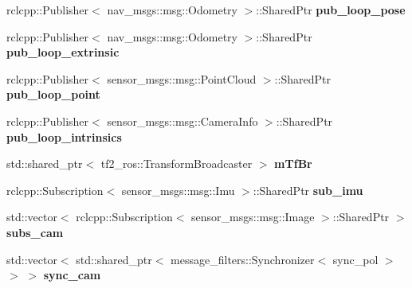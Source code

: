 \begin{DoxyCompactItemize}
\item 
\mbox{\label{classov__msckf_1_1ROS2Visualizer_a00966d928bfb510bf40aa6b6f59cb679}} 
rclcpp\+::\+Publisher$<$ nav\+\_\+msgs\+::msg\+::\+Odometry $>$\+::Shared\+Ptr {\bfseries pub\+\_\+loop\+\_\+pose}
\item 
\mbox{\label{classov__msckf_1_1ROS2Visualizer_aa7886e9a043be1355cc17e12109dd80d}} 
rclcpp\+::\+Publisher$<$ nav\+\_\+msgs\+::msg\+::\+Odometry $>$\+::Shared\+Ptr {\bfseries pub\+\_\+loop\+\_\+extrinsic}
\item 
\mbox{\label{classov__msckf_1_1ROS2Visualizer_ac20c79b7fd228d470a9b46d117f05b94}} 
rclcpp\+::\+Publisher$<$ sensor\+\_\+msgs\+::msg\+::\+Point\+Cloud $>$\+::Shared\+Ptr {\bfseries pub\+\_\+loop\+\_\+point}
\item 
\mbox{\label{classov__msckf_1_1ROS2Visualizer_a5f7d5dd515043eda74a01883753b137c}} 
rclcpp\+::\+Publisher$<$ sensor\+\_\+msgs\+::msg\+::\+Camera\+Info $>$\+::Shared\+Ptr {\bfseries pub\+\_\+loop\+\_\+intrinsics}
\item 
\mbox{\label{classov__msckf_1_1ROS2Visualizer_a8b19d66903795ab36e2e83829f7a2d0d}} 
std\+::shared\+\_\+ptr$<$ tf2\+\_\+ros\+::\+Transform\+Broadcaster $>$ {\bfseries m\+Tf\+Br}
\item 
\mbox{\label{classov__msckf_1_1ROS2Visualizer_aa0de94a640f501daaa26bff951d30085}} 
rclcpp\+::\+Subscription$<$ sensor\+\_\+msgs\+::msg\+::\+Imu $>$\+::Shared\+Ptr {\bfseries sub\+\_\+imu}
\item 
\mbox{\label{classov__msckf_1_1ROS2Visualizer_aa032dc3dff1852b1c2814a9eed51a768}} 
std\+::vector$<$ rclcpp\+::\+Subscription$<$ sensor\+\_\+msgs\+::msg\+::\+Image $>$\+::Shared\+Ptr $>$ {\bfseries subs\+\_\+cam}
\item 
\mbox{\label{classov__msckf_1_1ROS2Visualizer_aa3d947800332d651bb1bd5910511cda2}} 
std\+::vector$<$ std\+::shared\+\_\+ptr$<$ message\+\_\+filters\+::\+Synchronizer$<$ sync\+\_\+pol $>$ $>$ $>$ {\bfseries sync\+\_\+cam}

\end{DoxyCompactItemize}
